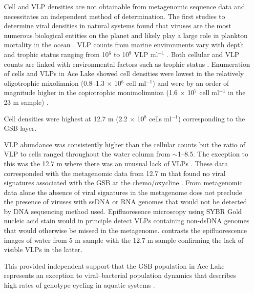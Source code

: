 Cell and \ac{VLP} densities are not obtainable from metagenomic sequence data and necessitates an independent method of determination.
The first studies to determine viral densities in natural systems found that viruses are the most numerous biological entities on the planet and likely play a large role in plankton mortality in the ocean \cite{Bergh1989,Proctor1990}. 
\ac{VLP} counts from marine environments vary with depth and trophic status ranging from 10$^6$ to 10$^8$ \acs{VLP} ml$^{-1}$ \cite{Suttle2005}.
Both cellular and \ac{VLP} counts are linked with environmental factors such as trophic status \cite{Lauro2009}. 
Enumeration of cells and \acp{VLP} in Ace Lake showed cell densities were lowest in the relatively oligotrophic mixolimnion (0.8--1.3 $\times$ 10$^6$ cell ml$^{-1}$) and were by an order of magnitude higher in the copiotrophic monimolimnion (1.6 $\times$ 10$^7$ cell ml$^{-1}$ in the 23 m sample) .

Cell densities were highest at 12.7 m (2.2 $\times$ 10$^8$ cells ml$^{-1}$) corresponding to the \ac{GSB} layer.


\ac{VLP} abundance was consistently higher than the cellular counts but the ratio of \ac{VLP} to cells ranged throughout the water column from $\sim$1--8.5.
The exception to this was the 12.7 m where there was an unusual lack of \acp{VLP} .
These data corresponded with the metagenomic data from 12.7 m that found no viral signatures associated with the \ac{GSB} at the chemo/oxycline \cite{Lauro2011}.
From metagenomic data alone the absence of viral signatures in the metagenome does not preclude the presence of viruses with ss\textsc{DNA} or \textsc{RNA} genomes that would not be detected by \textsc{DNA} sequencing method used.
Epifluoresence microscopy using SYBR Gold nucleic acid stain would in principle detect \acp{VLP} containing non-dsDNA genomes \cite{Patel2007} that would otherwise be missed in the metagenome.
 contrasts the epifluorescence images of water from 5 m sample with the 12.7 m sample confirming the lack of visible \acp{VLP} in the latter.

This provided independent support that the \ac{GSB} population in Ace Lake represents an exception to viral--bacterial population dynamics that describes high rates of genotype cycling in aquatic systems \cite{Rodriguez-Brito2010}.



